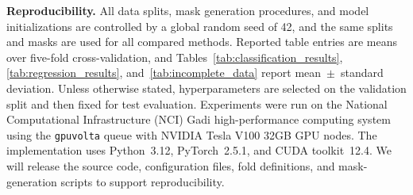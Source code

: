 \documentclass[times, review, 10pt]{elsarticle}
\begin{document}
\textbf{Reproducibility.}
All data splits, mask generation procedures, and model initializations are
controlled by a global random seed of 42, and the same splits and masks are used for
all compared methods. Reported table entries are means over five-fold
cross-validation, and Tables~\ref{tab:classification_results},
\ref{tab:regression_results}, and~\ref{tab:incomplete_data} report
mean~$\pm$~standard deviation. Unless otherwise stated, hyperparameters are selected on the
validation split and then fixed for test evaluation. Experiments were run on
the National Computational Infrastructure (NCI) Gadi high-performance
computing system using the \texttt{gpuvolta} queue with NVIDIA Tesla V100
32GB GPU nodes. The implementation uses Python~3.12, PyTorch~2.5.1, and
CUDA toolkit~12.4.
We will release the source code, configuration files, fold definitions, and
mask-generation scripts to support reproducibility.






\end{document}
